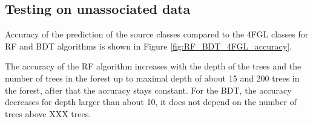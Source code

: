 \subsection{Testing on unassociated data}


Accuracy of the prediction of the source classes compared to the 4FGL classes for RF and BDT algorithms is shown in Figure \ref{fig:RF_BDT_4FGL_accuracy}.



The accuracy of the RF algorithm increases with the depth of the trees and the number of trees in the forest
up to maximal depth of about 15 and 200 trees in the forest, after that the accuracy stays constant.
For the BDT, the accuracy decreases for depth larger than about 10, it does not depend on the number of trees above XXX trees.


